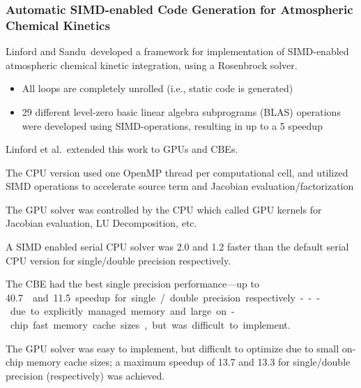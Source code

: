 \documentclass{beamer}
\newcounter{dummynote1}%
\newcounter{dummynote2}%
\begin{document}
\begin{frame}
 \frametitle{Automatic SIMD-enabled Code Generation for Atmospheric Chemical Kinetics}
 \setcounter{dummynote1}{\value{footnote}}
 \setcounter{dummynote2}{\value{footnote}}
 \addtocounter{dummynote1}{1}
 \addtocounter{dummynote2}{2}
 {
  Linford and Sandu\footnotemark[\value{dummynote1}]~developed a framework for implementation of SIMD-enabled atmospheric chemical kinetic integration, using a Rosenbrock solver.
 \begin{itemize}
  \item All loops are completely unrolled (i.e., static code is generated)
  \item 29 different level-zero basic linear algebra subprograms (BLAS) operations were developed using SIMD-operations, resulting in up to a \SI{5}{\times} speedup
 \end{itemize}
 }
 Linford et al.\footnotemark[\value{dummynote2}]~extended this work to GPUs and CBEs.
 \begin{itemize}
  {
  \item The CPU version used one OpenMP thread per computational cell, and utilized SIMD operations to accelerate source term and Jacobian evaluation\slash factorization
  \item The GPU solver was controlled by the CPU which called GPU kernels for Jacobian evaluation, LU Decomposition, etc.
  }
  {
  \item<2-> A SIMD enabled serial CPU solver was \SI{2.0}{\times} and \SI{1.2}{\times} faster than the default serial CPU version for single\slash double precision respectively.
  \item<2-> The CBE had the best single precision performance---up to \SI{40.7}\times and \SI{11.5}{\times} speedup for single\slash double precision respectively---due to explicitly managed memory and large on-chip fast memory cache sizes, but was difficult to implement.
  \item<2-> The GPU solver was easy to implement, but difficult to optimize due to small on-chip memory cache sizes; a maximum speedup of \SI{13.7}{\times} and \SI{13.3}{\times} for single\slash double precision (respectively) was achieved.
  }
 \end{itemize}
 {
 }
 \setcounter{footnote}{\value{dummynote2}} %
\end{frame}
\end{document}
